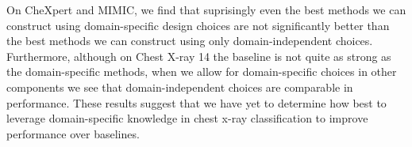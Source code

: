 On CheXpert and MIMIC, we find that suprisingly even the best methods we can construct using domain-specific design choices are not significantly better than the best methods we can construct using only domain-independent choices. Furthermore, although on Chest X-ray 14 the baseline is not quite as strong as the domain-specific methods, when we allow for domain-specific choices in other components we see that domain-independent choices are comparable in performance. These results suggest that we have yet to determine how best to leverage domain-specific knowledge in chest x-ray classification to improve performance over baselines.





